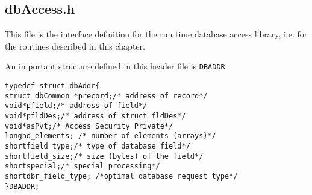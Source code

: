 \subsection{dbAccess.h}

This file is the interface definition for the run time database access library, i.e. for the routines described in this chapter.

An important structure defined in this header file is \verb|DBADDR| 

\begin{verbatim}typedef struct dbAddr{
struct dbCommon *precord;/* address of record*/
void*pfield;/* address of field*/
void*pfldDes;/* address of struct fldDes*/
void*asPvt;/* Access Security Private*/
longno_elements; /* number of elements (arrays)*/
shortfield_type;/* type of database field*/
shortfield_size;/* size (bytes) of the field*/
shortspecial;/* special processing*/
shortdbr_field_type; /*optimal database request type*/
}DBADDR;

\end{verbatim}
